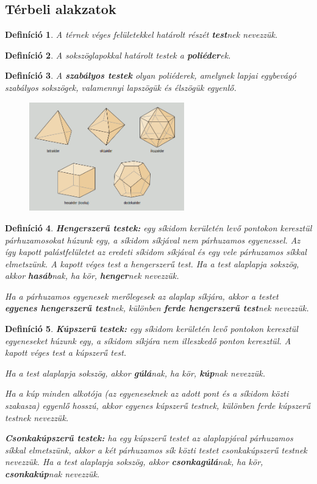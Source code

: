 \documentclass[12pt,a4paper]{article}
\newtheorem{definition}{Definíció} [section]
\begin{document}
\subsection{Térbeli alakzatok}

\begin{definition}
A térnek véges felületekkel határolt részét \textbf{test}nek nevezzük.
\end{definition}
\begin{definition}
A sokszöglapokkal határolt testek a \textbf{poliéder}ek.
\end{definition}
\begin{definition}
A \textbf{szabályos testek} olyan poliéderek, amelynek lapjai egybevágó szabályos sokszögek, valamennyi lapszögük és élszögük egyenlő.
\begin{figure}[h]
\centering
\includegraphics[width=0.6\textwidth]{szabalyos_testek}
\end{figure}
\end{definition}
\begin{definition}
\textbf{Hengerszerű testek:} egy síkidom kerületén levő pontokon keresztül párhuzamosokat húzunk egy, a síkidom síkjával nem párhuzamos egyenessel. Az így kapott palástfelületet az eredeti síkidom síkjával és egy vele párhuzamos síkkal elmetszünk. A kapott véges test a hengerszerű test. Ha a test alaplapja sokszög, akkor \textbf{hasáb}nak, ha kör, \textbf{henger}nek nevezzük.

Ha a párhuzamos egyenesek merőlegesek az alaplap síkjára, akkor a testet \textbf{egyenes hengerszerű test}nek, különben \textbf{ferde hengerszerű test}nek nevezzük.
\end{definition}
\newpage
\begin{definition}
\textbf{Kúpszerű testek:} egy síkidom kerületén levő pontokon keresztül egyeneseket húzunk egy, a síkidom síkjára nem illeszkedő ponton keresztül. A kapott véges test a kúpszerű test.

Ha a test alaplapja sokszög, akkor \textbf{gúlá}nak, ha kör, \textbf{kúp}nak nevezzük.

Ha a kúp minden alkotója (az egyeneseknek az adott pont és a síkidom közti szakasza) egyenlő hosszú, akkor egyenes kúpszerű testnek, különben ferde kúpszerű testnek nevezzük.

\textbf{Csonkakúpszerű testek:} ha egy kúpszerű testet az alaplapjával párhuzamos síkkal elmetszünk, akkor a két párhuzamos sík közti testet csonkakúpszerű testnek nevezzük. Ha a test alaplapja sokszög, akkor \textbf{csonkagúlá}nak, ha kör, \textbf{csonkakúp}nak nevezzük.
\end{definition}
\end{document}
